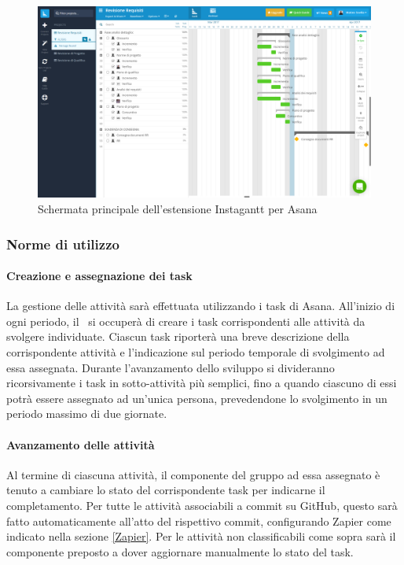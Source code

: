\documentclass[../NormeDiProgetto.tex]{subfiles}
\begin{document}
				\begin{figure} [h!]
					\centering
					\includegraphics[scale=0.2]{./Immagini/Instagantt.png}
					\caption{Schermata principale dell'estensione Instagantt per Asana}\label{fig:InstExtAsana}
				\end{figure}
			\subsubsection{Norme di utilizzo}
				\paragraph{Creazione e assegnazione dei task\\}
					La gestione delle attività sarà effettuata utilizzando i task di Asana.
					All'inizio di ogni periodo, il \responsabilediprogetto\ si occuperà di creare i
					task corrispondenti alle attività da svolgere individuate. Ciascun task riporterà
					una breve descrizione della corrispondente attività e l'indicazione sul periodo temporale di
					svolgimento ad essa assegnata. Durante l'avanzamento dello sviluppo si divideranno
					ricorsivamente i task in sotto-attività più semplici, fino a quando ciascuno di essi potrà
					essere assegnato ad un'unica persona, prevedendone lo svolgimento in un periodo massimo di
					due giornate.
				\paragraph{Avanzamento delle attività\\}
					Al termine di ciascuna attività, il componente del gruppo ad essa assegnato è tenuto a
					cambiare lo stato del corrispondente task per indicarne il completamento.
					Per tutte le attività associabili a commit su GitHub, questo sarà fatto automaticamente
					all'atto del rispettivo commit, configurando Zapier come indicato nella sezione \ref{Zapier}.
					Per le attività non classificabili come sopra sarà il componente preposto a dover
					aggiornare manualmente lo stato del task.
\end{document}
